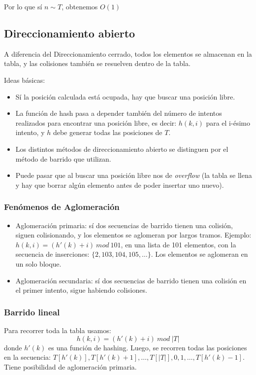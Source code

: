 Por lo que sí $n \sim T$, obtenemos $O(1)$

\subsection{Direccionamiento abierto}
A diferencia del Direccionamiento cerrado, todos los elementos se almacenan en la tabla, y las colisiones tambi\'en se resuelven dentro de la tabla.

Ideas b\'asicas:
\begin{itemize}
\item S\'i la posici\'on calculada est\'a ocupada, hay que buscar una posici\'on libre.
\item La funci\'on de hash pasa a depender tambi\'en del n\'umero de intentos realizados para encontrar una posici\'on libre, es decir: $h(k,i)$ para el i-\'esimo intento, y $h$ debe generar todas las posiciones de $T$.
\item Los distintos m\'etodos de direccionamiento abierto se distinguen por el m\'etodo de barrido que utilizan.
\item Puede pasar que al buscar una posici\'on libre nos de \textit{overflow} (la tabla se llena y hay que borrar alg\'un elemento antes de poder insertar uno nuevo).
\end{itemize}

\subsubsection{Fen\'omenos de Aglomeraci\'on}
\begin{itemize}
\item Aglomeraci\'on primaria: s\'i dos secuencias de barrido tienen una colisi\'on, siguen colisionando, y los elementos se aglomeran por largos tramos.
Ejemplo: $h(k,i) = (h'(k) + i)\ mod\ 101$, en una lista de 101 elementos, con la secuencia de inserciones: $\{2, 103, 104, 105,\dots\}$. Los elementos se aglomeran en un solo bloque.
\item Aglomeraci\'on secundaria: s\'i dos secuencias de barrido tienen una colisi\'on en el primer intento, sigue habiendo colisiones.
\end{itemize}

\subsubsection{Barrido lineal}
Para recorrer toda la tabla usamos:
$$h(k,i) = (h'(k) + i)\ mod\ |T|$$
donde $h'(k)$ es una funci\'on de hashing. Luego, se recorren todas las posiciones en la secuencia: $T[h'(k)], T[h'(k) + 1], \dots, T[|T|], 0, 1, \dots, T[h'(k) - 1]$. Tiene posibilidad de aglomeraci\'on primaria.
